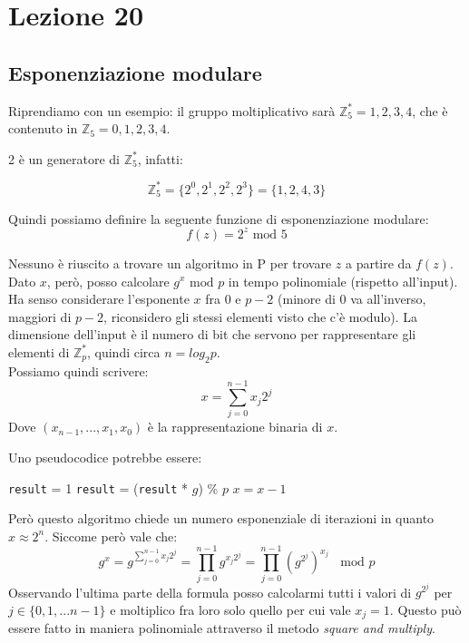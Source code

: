 \section*{Lezione 20}

\subsection*{Esponenziazione modulare}
Riprendiamo con un esempio: il gruppo moltiplicativo sarà $\mathbb{Z}_5^* = 1,2,3,4$, che è contenuto in $\mathbb{Z}_5 = {0,1,2,3,4}$.

2 è un generatore di $\mathbb{Z}_5^*$, infatti:

\[
\mathbb{Z}_5^* = \{2^0, 2^1, 2^2, 2^3\} = \{1,2,4,3\}
\]

Quindi possiamo definire la seguente funzione di esponenziazione modulare:
\begin{equation*}
f(z) = 2^z \text{ mod } 5
\end{equation*}

Nessuno è riuscito a trovare un algoritmo in P per trovare $z$ a partire da $f(z)$.
Dato $x$, però, posso calcolare $g^x \text { mod } p$ in tempo polinomiale (rispetto all'input). Ha senso considerare l'esponente $x$ fra 0 e $p-2$ (minore di 0 va all'inverso, maggiori di $p-2$, riconsidero gli stessi elementi visto che c'è modulo).
La dimensione dell'input è il numero di bit che servono per rappresentare gli elementi di $\mathbb{Z}_p^*$, quindi circa $n=log_2p$.\\
Possiamo quindi scrivere:
\begin{equation*}
	x = \sum_{j=0}^{n-1}x_j2^j
\end{equation*}
Dove $(x_{n-1}, ..., x_1, x_0)$ è la rappresentazione binaria di $x$.

Uno pseudocodice potrebbe essere:

\medskip
	\begin{algorithmic}
	\State \texttt{result} = 1
	\State \texttt{result} = (\texttt{result} * $g$) \% $p$
	\State $x = x - 1$
	\EndWhile
\end{algorithmic}

\medskip
Però questo algoritmo chiede un numero esponenziale di iterazioni in quanto $x \approx 2^n$.
Siccome però vale che:
\begin{equation*}
	g^x = g^{\sum_{j=0}^{n-1}x_j2^j} = \prod_{j=0}^{n-1} g^{x_j2^j}= \prod_{j=0}^{n-1}(g^{2^j})^{x_j} \; \; \text{ mod } p
\end{equation*}
Osservando l'ultima parte della formula posso calcolarmi tutti i valori di $g^{2^j}$ per $j \in \{0,1,...n-1\}$ e moltiplico fra loro solo quello per cui vale $x_j = 1$. Questo può essere fatto in maniera polinomiale attraverso il metodo \textit{square and multiply}.


